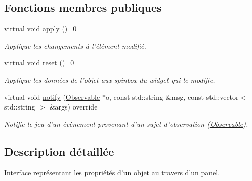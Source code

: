 \subsection*{Fonctions membres publiques}
\begin{DoxyCompactItemize}
\item 
\hypertarget{classPropertiesInterface_a62f1147d49d284073aa8f65f0b3dae70}{virtual void \hyperlink{classPropertiesInterface_a62f1147d49d284073aa8f65f0b3dae70}{apply} ()=0}\label{classPropertiesInterface_a62f1147d49d284073aa8f65f0b3dae70}

\begin{DoxyCompactList}\small\item\em Applique les changements à l’élément modifié. \end{DoxyCompactList}\item 
\hypertarget{classPropertiesInterface_a0d80d597bd813f68c2e5d93a986395a2}{virtual void \hyperlink{classPropertiesInterface_a0d80d597bd813f68c2e5d93a986395a2}{reset} ()=0}\label{classPropertiesInterface_a0d80d597bd813f68c2e5d93a986395a2}

\begin{DoxyCompactList}\small\item\em Applique les données de l’objet aux spinbox du widget qui le modifie. \end{DoxyCompactList}\item 
virtual void \hyperlink{classPropertiesInterface_a317a8df57b8387be63632a31eddb241d}{notify} (\hyperlink{classObservable}{Observable} $\ast$o, const std\+::string \&msg, const std\+::vector$<$ std\+::string $>$ \&args) override
\begin{DoxyCompactList}\small\item\em Notifie le jeu d'un évènement provenant d'un sujet d'observation (\hyperlink{classObservable}{Observable}). \end{DoxyCompactList}\end{DoxyCompactItemize}


\subsection{Description détaillée}
Interface représentant les propriétés d'un objet au travers d'un panel. 


